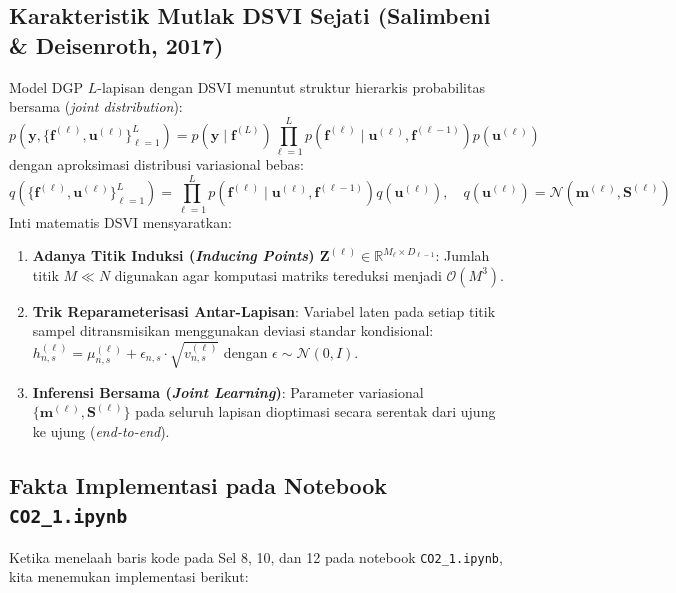 \documentclass[11pt,a4paper]{article}
\begin{document}
\subsection{Karakteristik Mutlak DSVI Sejati (Salimbeni \& Deisenroth, 2017)}
Model DGP $L$-lapisan dengan DSVI menuntut struktur hierarkis probabilitas bersama (\textit{joint distribution}):
\begin{equation}
    p\left(\mathbf{y}, \{\mathbf{f}^{(\ell)}, \mathbf{u}^{(\ell)}\}_{\ell=1}^L\right) = p(\mathbf{y} \mid \mathbf{f}^{(L)}) \prod_{\ell=1}^L p\left(\mathbf{f}^{(\ell)} \mid \mathbf{u}^{(\ell)}, \mathbf{f}^{(\ell-1)}\right) p(\mathbf{u}^{(\ell)})
\end{equation}
dengan aproksimasi distribusi variasional bebas:
\begin{equation}
    q\left(\{\mathbf{f}^{(\ell)}, \mathbf{u}^{(\ell)}\}_{\ell=1}^L\right) = \prod_{\ell=1}^L p\left(\mathbf{f}^{(\ell)} \mid \mathbf{u}^{(\ell)}, \mathbf{f}^{(\ell-1)}\right) q(\mathbf{u}^{(\ell)}), \quad q(\mathbf{u}^{(\ell)}) = \mathcal{N}(\mathbf{m}^{(\ell)}, \mathbf{S}^{(\ell)})
\end{equation}
Inti matematis DSVI mensyaratkan:
\begin{enumerate}\setlength{\itemsep}{1pt}
    \item \textbf{Adanya Titik Induksi (\textit{Inducing Points}) $\mathbf{Z}^{(\ell)} \in \mathbb{R}^{M_\ell \times D_{\ell-1}}$}: Jumlah titik $M \ll N$ digunakan agar komputasi matriks tereduksi menjadi $\mathcal{O}(M^3)$.
    \item \textbf{Trik Reparameterisasi Antar-Lapisan}: Variabel laten pada setiap titik sampel ditransmisikan menggunakan deviasi standar kondisional: $h_{n,s}^{(\ell)} = \mu_{n,s}^{(\ell)} + \epsilon_{n,s} \cdot \sqrt{v_{n,s}^{(\ell)}}$ dengan $\epsilon \sim \mathcal{N}(0, I)$.
    \item \textbf{Inferensi Bersama (\textit{Joint Learning})}: Parameter variasional $\{\mathbf{m}^{(\ell)}, \mathbf{S}^{(\ell)}\}$ pada seluruh lapisan dioptimasi secara serentak dari ujung ke ujung (\textit{end-to-end}).
\end{enumerate}

\subsection{Fakta Implementasi pada Notebook \texttt{CO2\_1.ipynb}}
Ketika menelaah baris kode pada Sel 8, 10, dan 12 pada notebook \texttt{CO2\_1.ipynb}, kita menemukan implementasi berikut:
\end{document}
